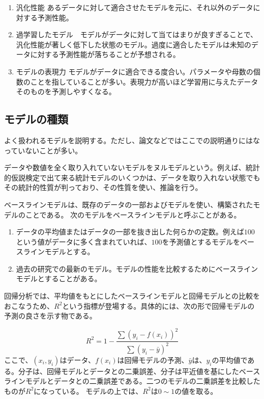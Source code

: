 \begin{enumerate}
 \item 汎化性能 あるデータに対して適合させたモデルを元に、それ以外のデータに対する予測性能。
 \item 過学習したモデル　モデルがデータに対して当てはまりが良すぎることで、汎化性能が著しく低下した状態のモデル。過度に適合したモデルは未知のデータに対する予測性能が落ちることが予想される。
 \item モデルの表現力 モデルがデータに適合できる度合い。パラメータや母数の個数のことを指していることが多い。表現力が高いほど学習用に与えたデータそのものを予測しやすくなる。
\end{enumerate}

\subsection{モデルの種類}
よく扱われるモデルを説明する。ただし、論文などではここでの説明通りにはなっていないことが多い。

データや数値を全く取り入れていないモデルをヌルモデルという。例えば、統計的仮説検定で出て来る統計モデルのいくつかは、データを取り入れない状態でもその統計的性質が判っており、その性質を使い、推論を行う。


ベースラインモデルは、既存のデータの一部およびモデルを使い、構築されたモデルのことである。
次のモデルをベースラインモデルと呼ぶことがある。
\begin{enumerate}
 \item データの平均値またはデータの一部を抜き出した何らかの定数。例えば$100$という値がデータに多く含まれていれば、$100$を予測値とするモデルをベースラインモデルとする。
 \item 過去の研究での最新のモデル。モデルの性能を比較するためにベースラインモデルとすることがある。
\end{enumerate}

回帰分析では、平均値をもとにしたベースラインモデルと回帰モデルとの比較をおこなうため、$R^2$という指標が登場する。具体的には、次の形で回帰モデルの予測の良さを示す物である。

\begin{equation}
R^2 = 1- \frac{\sum (y_i-f(x_i))^2}{\sum (y_i-\bar{y})^2}
\end{equation}
ここで、$(x_i,y_i)$はデータ、$f(x_i)$は回帰モデルの予測、$\bar{y}$は、$y_i$の平均値である。分子は、回帰モデルとデータとの二乗誤差、分子は平近値を基にしたベースラインモデルとデータとの二乗誤差である。二つのモデルの二乗誤差を比較したものが$R^2$になっている。
モデルの上では、$R^2$は$0\sim 1$の値を取る。


